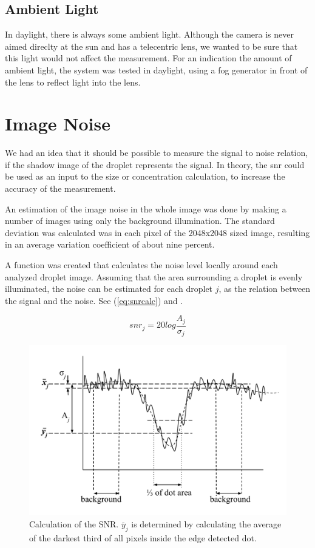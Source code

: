 \subsection{Ambient Light}

In daylight, there is always some ambient light. Although the camera is never aimed direclty at the sun and has a telecentric lens, we wanted to be sure that this light would not affect the measurement. For an indication the amount of ambient light, the system was tested in daylight, using a fog generator in front of the lens to reflect light into the lens. 

\section{Image Noise}

We had an idea that it should be possible to measure the signal to noise relation, if the shadow image of the droplet represents the signal. In theory, the \gls{snr} could be used as an input to the size or concentration calculation, to increase the accuracy of the measurement. 

An estimation of the image noise in the whole image was done by making a number of images using only the background illumination. The standard deviation was calculated was in each pixel of the 2048x2048 sized image, resulting in an average variation coefficient of about nine percent.

A function was created that calculates the noise level locally around each analyzed droplet image. Assuming that the area surrounding a droplet is evenly illuminated, the noise can be estimated for each droplet $j$, as the relation between the signal and the noise. See (\ref{eq:snrcalc}) and .

\begin{equation}
snr_j = 20 log \frac{A_j}{\sigma_j}
\label{eq:snrcalc}
\end{equation}

\begin{figure}%
\centering\includegraphics[width=0.6\linewidth]{figures/snrcalc}
\caption{Calculation of the SNR. $\overline{y}_j$ is determined by calculating the average of the darkest third of all pixels inside the edge detected dot.}
\label{fig:snrcalc}
\end{figure}

